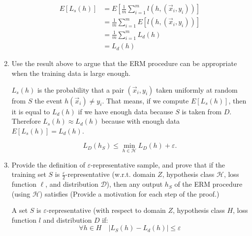 \documentclass[a4paper,11pt,oneside]{book}
\begin{document}
\begin{enumerate}
\begin{solution}
        \begin{align*}
        E[L_s(h)] &= E\left[\frac{1}{m}\sum_{i=1}^m l(h, (\vec{x}_i,y_i))\right] \\
        &= \frac{1}{m}\sum_{i=1}^m E[l(h, (\vec{x}_i,y_i))] \\
        &= \frac{1}{m}\sum_{i=1}^m L_d(h) \\
        &= L_d(h)
        \end{align*}
    \end{solution}
\item Use the result above to argue that the ERM procedure can be appropriate when the training data is large enough.
    \begin{solution}
        $L_s(h)$ is the probability that a pair $(\vec{x}_i,y_i)$ taken uniformly at random from $S$ the event $h(\vec{x}_i) \neq y_i$. That means, if we compute $E[L_s(h)]$, then it is equal to $L_d(h)$ if we have enough data because $S$ is taken from $D$. Therefore $L_s(h) \approx L_d(h)$ because with enough data $E[L_s(h)] = L_d(h)$.
    \end{solution}
    $$L_D(h_S) \leq \min_{h\in\mathcal{H}} L_D(h) + \varepsilon.$$
\item Provide the definition of $\varepsilon$-representative sample, and prove that if the training set $S$ is $\frac{\varepsilon}{2}$-representative (w.r.t. domain $Z$, hypothesis class $\mathcal{H}$, loss function $\ell$, and distribution $\mathcal{D}$), then any output $h_S$ of the ERM procedure (using $\mathcal{H}$) satisfies
(Provide a motivation for each step of the proof.)
    \begin{solution}
        A set $S$ is $\varepsilon$-representative (with respect to domain $Z$, hypothesis class $H$, loss function $l$ and distribution $D$ if: 
        $$\forall h \in H \quad |L_S(h) - L_d(h)| \leq \varepsilon$$
    \end{solution}
\end{enumerate}
\end{document}
